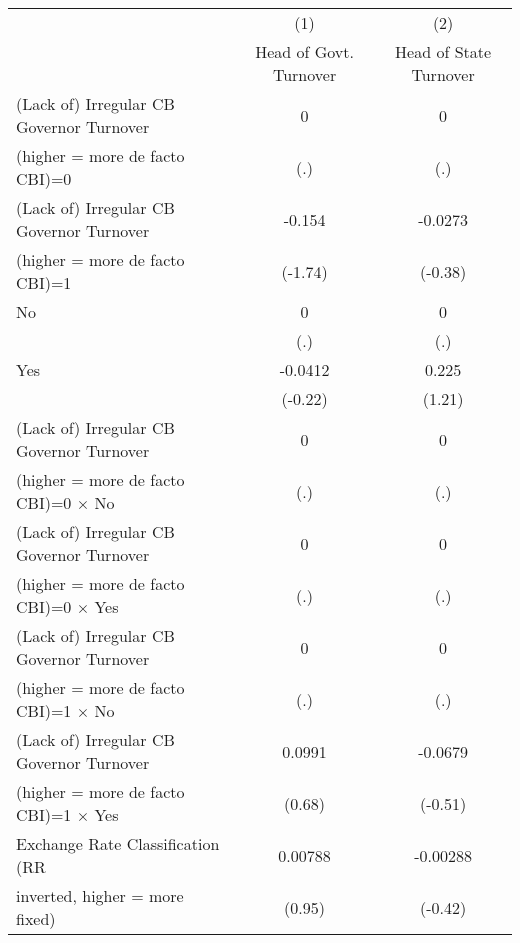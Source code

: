 {
\def\sym#1{\ifmmode^{#1}\else\(^{#1}\)\fi}
\begin{tabular}{l*{2}{c}}
\toprule
                                        &\multicolumn{1}{c}{(1)}&\multicolumn{1}{c}{(2)}\\
                                        &\multicolumn{1}{c}{Head of Govt. Turnover}&\multicolumn{1}{c}{Head of State Turnover}\\
\midrule
(Lack of) Irregular CB Governor Turnover&    0         &    0         \\
(higher = more de facto CBI)=0          &  (.)         &  (.)         \\
\addlinespace
(Lack of) Irregular CB Governor Turnover&-0.154         &-0.0273         \\
(higher = more de facto CBI)=1          &(-1.74)         &(-0.38)         \\
\addlinespace
No                                      &    0         &    0         \\
                                        &  (.)         &  (.)         \\
\addlinespace
Yes                                     &-0.0412         &0.225         \\
                                        &(-0.22)         &(1.21)         \\
\addlinespace
(Lack of) Irregular CB Governor Turnover&    0         &    0         \\
(higher = more de facto CBI)=0 $\times$ No&  (.)         &  (.)         \\
\addlinespace
(Lack of) Irregular CB Governor Turnover&    0         &    0         \\
(higher = more de facto CBI)=0 $\times$ Yes&  (.)         &  (.)         \\
\addlinespace
(Lack of) Irregular CB Governor Turnover&    0         &    0         \\
(higher = more de facto CBI)=1 $\times$ No&  (.)         &  (.)         \\
\addlinespace
(Lack of) Irregular CB Governor Turnover&0.0991         &-0.0679         \\
(higher = more de facto CBI)=1 $\times$ Yes&(0.68)         &(-0.51)         \\
\addlinespace
Exchange Rate Classification (RR        &0.00788         &-0.00288         \\
inverted, higher = more fixed)          &(0.95)         &(-0.42)         \\

\end{tabular}}
